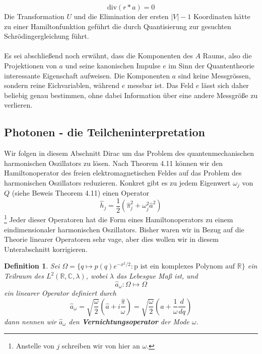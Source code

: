 \documentclass[11pt,a4paper,leqno]{report}
\newtheorem{definition}[theorem]{Definition}
\numberwithin{equation}{chapter}
\begin{document}
 \begin{equation}
	\text{div}(r * a) = 0
\end{equation}
Die Transformation $U$ und die Elimination der ersten $|V| - 1$ Koordinaten h\"atte zu einer Hamiltonfunktion gef\"uhrt die durch Quantisierung zur gesuchten Schr\"odingergleichung f\"uhrt.\\
\\
Es sei abschlie\ss{}end noch erw\"ahnt, dass die Komponenten des $A$ Raums, also die Projektionen von $a$ und seine kanonischen Impulse $e$ im Sinn der Quantentheorie interessante Eigenschaft aufweisen. Die Komponenten $a$ sind keine Messgr\"oss{}en, sondern reine Eichvariablen, w\"ahrend $e$ messbar ist. Das Feld $e$ l\"asst sich daher beliebig genau bestimmen, ohne dabei Information \"uber eine andere Messgr\"o\ss{}e zu verlieren.
\subsection{Photonen - die Teilcheninterpretation}
Wir folgen in diesem Abschnitt Dirac um das Problem des quantenmechanischen harmonischen Oszillators zu l\"osen. Nach Theorem 4.11 k\"onnen wir den Hamiltonoperator des freien elektromagnetischen Feldes auf das Problem des harmonischen Oszillators reduzieren. Konkret gibt es zu jedem Eigenwert $\omega_j$ von $Q$ (siehe Beweis Theorem 4.11) einen Operator
\begin{equation*}
	\hat{h}_j = \frac{1}{2}(\hat{\pi}_j^2 + \omega_j^2 \hat{a}^2)
\end{equation*}\footnote{Anstelle von $j$ schreiben wir von hier an $\omega$.}
Jeder dieser Operatoren hat die Form eines Hamiltonoperators zu einem eindimensionaler harmonischen Oszillators. Bisher waren wir in Bezug auf die Theorie linearer Operatoren sehr vage, aber dies wollen wir in diesem Unterabschnitt korrigieren.
\begin{definition}
	Sei $\Omega=\{q\mapsto p(q)e^{-x^2 / 2}: \text{p ist ein komplexes Polynom auf $\mathbb{R}$}\}$ ein Teilraum des $L^2(\mathbb{R}, \mathbb{C},\lambda)$, wobei $\lambda$ das Lebesgue Ma\ss{} ist, und 
	\begin{equation}
		\hat{a}_\omega: \Omega \mapsto \Omega
	\end{equation}
ein linearer Operator definiert durch 
\begin{equation}
	\hat{a}_\omega = \sqrt{\frac{\omega}{2}}(\hat{a} + i \frac{\hat{\pi}}{\omega}) = \sqrt{\frac{\omega}{2}}(a +  \frac{1}{\omega}\frac{d}{dq})
\end{equation}
dann nennen wir $\hat{a}_\omega$ den \textbf{Vernichtungsoperator} der Mode $\omega$.
\end{definition}
\end{document}
